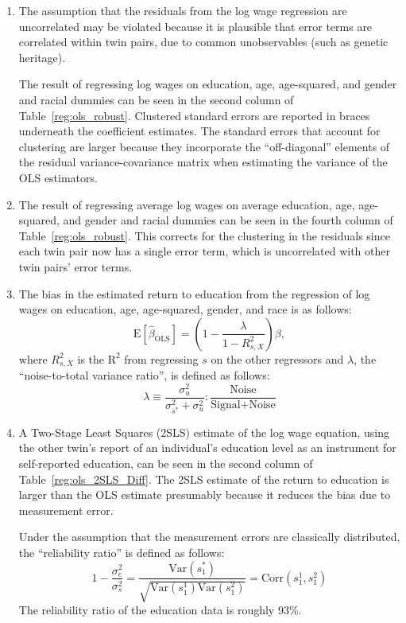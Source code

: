 \documentclass{article}
\begin{document}
\begin{enumerate}
\begin{enumerate}
\item The assumption that the residuals from the log wage regression are uncorrelated may be violated because it is plausible that error terms are correlated within twin pairs, due to common unobservables (such as genetic heritage).

The result of regressing log wages on education, age, age-squared, and gender and racial dummies can be seen in the second column of Table~\ref{reg:ols_robust}. Clustered standard errors are reported in braces underneath the coefficient estimates. The standard errors that account for clustering are larger because they incorporate the ``off-diagonal'' elements of the residual variance-covariance matrix when estimating the variance of the OLS estimators.

\item The result of regressing average log wages on average education, age, age-squared, and gender and racial dummies can be seen in the fourth column of Table~\ref{reg:ols_robust}. This corrects for the clustering in the residuals since each twin pair now has a single error term, which is uncorrelated with other twin pairs' error terms.

\item The bias in the estimated return to education from the regression of log wages on education, age, age-squared, gender, and race is as follows:
\begin{equation}\text{E}\left[\hat{\beta}_{\text{OLS}}\right]=\left(1-\frac{\lambda}{1-R^{2}_{s,X}}\right)\beta,\end{equation}
where $R^{2}_{s,X}$ is the $\text{R}^{2}$ from regressing $s$ on the other regressors and $\lambda$, the ``noise-to-total variance ratio'', is defined as follows:
\begin{equation}\lambda \equiv \frac{\sigma_{u}^{2}}{\sigma_{s^{*}}^{2}+\sigma_{u}^{2}} : \frac{\text{Noise}}{\text{Signal}+\text{Noise}}\end{equation}

\item A Two-Stage Least Squares (2SLS) estimate of the log wage equation, using the other twin's report of an individual's education level as an instrument for self-reported education, can be seen in the second column of Table~\ref{reg:ols_2SLS_Diff}. The 2SLS estimate of the return to education is larger than the OLS estimate presumably because it reduces the bias due to measurement error.

Under the assumption that the measurement errors are classically distributed, the ``reliability ratio'' is defined as follows:
\begin{equation}1-\frac{\sigma_{e}^{2}}{\sigma_{s}^{2}}=\frac{\text{Var}(s_{1}^{*})}{\sqrt{\text{Var}(s_{1}^{1})\text{Var}(s_{1}^{2})}}=\text{Corr}(s_{1}^{1},s_{1}^{2})\end{equation}
The reliability ratio of the education data is roughly 93\%.


\end{enumerate}
\end{enumerate}
\end{document}
